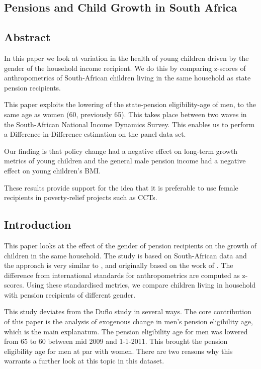 \begin{refsection}
\chapter{Pensions and Child Growth in South Africa}
\label{sa}
\section*{Abstract}
In this paper we look at variation in the health of young children driven by the gender of the household income recipient.
We do this by comparing z-scores of anthropometrics of South-African children living in the same household as state pension recipients.

This paper exploits the lowering of the state-pension eligibility-age of men, 
to the same age as women (60, previously 65).
This takes place between two waves in the South-African National Income Dynamics Survey.
This enables us to perform a Difference-in-Difference estimation on the panel data set.

Our finding is that policy change had a negative effect on long-term growth metrics of young children
and the general male pension income had a negative effect on young children's BMI.

These results provide support for the idea that it is preferable to use female recipients in poverty-relief projects such as CCTs.
\pagebreak

\section{Introduction}
\label{sa:intro}
This paper looks at the effect of the gender of pension recipients on the growth of children in the same household.
The study is based on South-African data and the approach is very similar to \textcite{duflo2000child,duflo2003grandmothers},
and originally based on the work of \textcite{thomas1994like}.
The difference from international standards \parencite[WHO Child Growth Standards]{who2006child} for anthropometrics are computed as z-scores.
Using these standardised metrics, we compare children living in household with pension recipients of different gender.

This study deviates from the Duflo study in several ways.
The core contribution of this paper is the analysis of exogenous change in men's pension eligibility age,
which is the main explanatum.
The pension eligibility age for men was lowered from 65 to 60 between mid 2009 and 1-1-2011.
This brought the pension eligibility age for men at par with women.
There are two reasons why this warrants a further look at this topic in this dataset.


\end{refsection}
